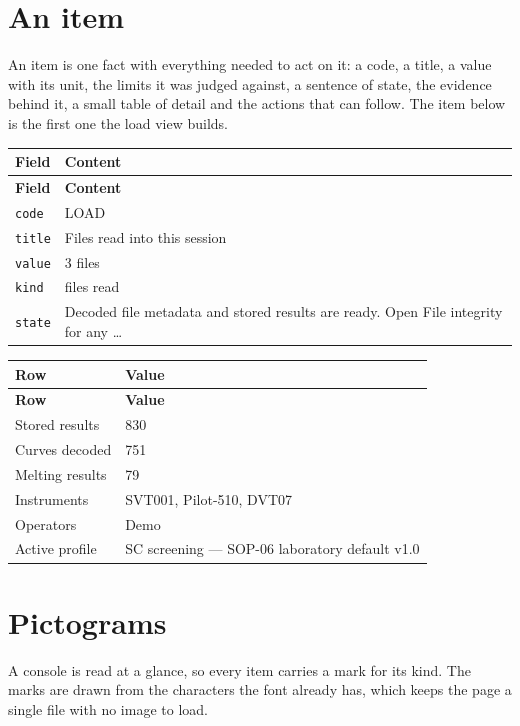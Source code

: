 \section{An item}
An item is one fact with everything needed to act on it: a code, a title, a value
with its unit, the limits it was judged against, a sentence of state, the evidence
behind it, a small table of detail and the actions that can follow. The item below
is the first one the load view builds.

{\small
\begin{xltabular}{\linewidth}{|X|l|}
\toprule \textbf{Field} & \textbf{Content} \\\midrule\endfirsthead
\toprule \textbf{Field} & \textbf{Content} \\\midrule\endhead
\texttt{code} & LOAD \\
\texttt{title} & Files read into this session \\
\texttt{value} & 3 files \\
\texttt{kind} & files read \\
\texttt{state} & Decoded file metadata and stored results are ready. Open File integrity for any … \\
\bottomrule
\end{xltabular}}

{\small
\begin{xltabular}{\linewidth}{|X|l|}
\toprule \textbf{Row} & \textbf{Value} \\\midrule\endfirsthead
\toprule \textbf{Row} & \textbf{Value} \\\midrule\endhead
Stored results & 830 \\
Curves decoded & 751 \\
Melting results & 79 \\
Instruments & SVT001, Pilot-510, DVT07 \\
Operators & Demo \\
Active profile & SC screening — SOP-06 laboratory default v1.0 \\
\bottomrule
\end{xltabular}}


\section{Pictograms}
A console is read at a glance, so every item carries a mark for its kind. The
marks are drawn from the characters the font already has, which keeps the page a
single file with no image to load.

